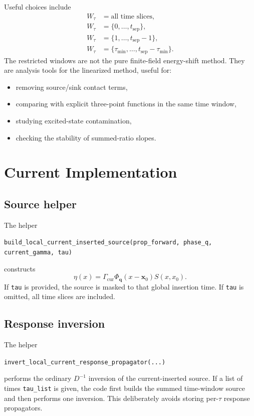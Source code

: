 \documentclass[11pt,a4paper]{article}
\newcommand{\Dslash}{D}
\begin{document}
Useful choices include
\begin{align}
  W_\tau &= \text{all time slices},\\
  W_\tau &= \{0,\ldots,t_{\mathrm{sep}}\},\\
  W_\tau &= \{1,\ldots,t_{\mathrm{sep}}-1\},\\
  W_\tau &= \{\tau_{\min},\ldots,t_{\mathrm{sep}}-\tau_{\min}\}.
\end{align}
The restricted windows are not the pure finite-field energy-shift method.
They are analysis tools for the linearized method, useful for:
\begin{itemize}
  \item removing source/sink contact terms,
  \item comparing with explicit three-point functions in the same time window,
  \item studying excited-state contamination,
  \item checking the stability of summed-ratio slopes.
\end{itemize}

\section{Current Implementation}

\subsection{Source helper}

The helper
\begin{center}
\texttt{build\_local\_current\_inserted\_source(prop\_forward, phase\_q, current\_gamma, tau)}
\end{center}
constructs
\begin{equation}
  \eta(x)
  =
  \Gamma_{\mathrm{cur}}\Phi_{\mathbf q}(x-\mathbf x_0)S(x,x_0).
\end{equation}
If \texttt{tau} is provided, the source is masked to that global insertion time.
If \texttt{tau} is omitted, all time slices are included.

\subsection{Response inversion}

The helper
\begin{center}
\texttt{invert\_local\_current\_response\_propagator(...)}
\end{center}
performs the ordinary \(\Dslash^{-1}\) inversion of the current-inserted
source.  If a list of times \texttt{tau\_list} is given, the code first builds
the summed time-window source and then performs one inversion.  This deliberately
avoids storing per-\(\tau\) response propagators.
\end{document}
